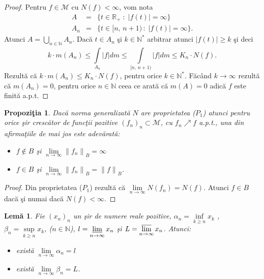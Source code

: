 \documentclass[ a4paper, 12pt]{report}
\newtheorem{prop}[theorem]{\bf Propozi\c tia }
\newtheorem{lema}[theorem]{\bf{Lem\u a}}
\theoremstyle{definition}
\theoremstyle{remark}
\numberwithin{equation}{section}
\begin{document}
\begin{proof} Pentru $f \in \mathcal{M}$ cu $N(f)<\infty$, vom nota
\begin{eqnarray*}
A&=&\{t \in \mathbb{R_+}\; : \; \lvert f(t) \rvert = \infty\}\\
A_n&=&\{t \in [n,\, n+1) \, : \; \lvert f(t) \rvert = \infty\}.
\end{eqnarray*}
Atunci $A=\bigcup\limits_{n \in \mathbb{N}}^{}{A_n}$. Dac\u a $t \in A_n$ \c si $k \in \mathbb{N^*}$ arbitrar atunci
$\lvert f(t) \rvert \geq k$ \c si deci
$$k \cdot m(A_n) \leq \int\limits_{A_n}^{}{\lvert f \rvert} dm \leq \int\limits_{[n,\, n+1)}^{}{\lvert f \rvert} dm \leq K_n \cdot N(f).$$
Rezult\u a c\u a $k \cdot m(A_n) \leq K_n \cdot N(f)$, pentru orice $k \in \mathbb{N^*}$. F\u ac\^ and $k \rightarrow \infty$ rezult\u a c\u a $m(A_n)=0$, pentru orice $n \in \mathbb{N}$ ceea ce arat\u a c\u a $m(A)=0$ adic\u a $f$ este finit\u a a.p.t.
\end{proof}

\begin{prop}
Dac\u a norma generalizat\u a $N$ are proprietatea ($P_1$) atunci pentru orice \c sir cresc\u ator de func\c tii pozitive $(f_n)_n \subset \mathcal{M}$, cu $f_n \nearrow f$ a.p.t.,
una din afirma\c tiile de mai jos este adev\u arat\u a:
\begin{itemize}
\item[(a)] $f \notin B$ \c si $\lim\limits_{n \to \infty}{\lVert f_n \rVert}_B = \infty$

\item[(b)] $f \in B$ \c si $\lim\limits_{n \to \infty}{\lVert f_n \rVert}_B = {\lVert f \rVert}_B$.
\end{itemize}
\end{prop}

\begin{proof}
Din proprietatea ($P_1$) rezult\u a c\u a $\lim\limits_{n \to \infty} N(f_n) = N(f)$. Atunci $f \in B$ dac\u a \c si numai dac\u a $N(f)<\infty$.
\end{proof}

\begin{lema}
Fie $(x_n)_n$ un \c sir de numere reale pozitive, $\alpha_n =\inf\limits_{k \geq n} x_k$ , $\beta_n = \sup\limits_{k \geq n} x_k$, ($n \in \mathbb{N}$),
$l = \varliminf\limits_{n \rightarrow \infty} x_n$ \c si $L= \varlimsup\limits_{n \to \infty} x_n$. Atunci:
\begin{itemize}
\item[(i)] exist\u a $\lim\limits_{n \rightarrow \infty}\alpha_n = l$
\item[(ii)] exist\u a $\lim\limits_{n \rightarrow \infty}\beta_n = L$.
\end{itemize}
\end{lema}
\end{document}
